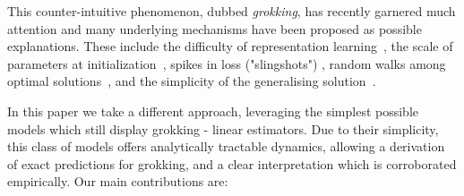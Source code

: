 \documentclass[a4paper,11pt]{article}
\begin{document}
This counter-intuitive phenomenon, dubbed \emph{grokking}, has recently garnered much attention and many underlying mechanisms have been proposed as possible explanations. These include the difficulty of representation learning~\cite{liu2022towards}, the scale of parameters at initialization~\cite{liu2023omnigrok}, spikes in loss ("slingshots") \cite{thilak2022slingshot}, random walks among optimal solutions~\cite{millidge2022}, and the simplicity of the generalising solution~\cite[Appendix E]{nanda2023progress}.

In this paper we take a different approach, leveraging the simplest possible models which still display grokking - linear estimators. Due to their simplicity, this class of models offers analytically tractable dynamics, allowing a derivation of exact predictions for grokking, and a clear interpretation which is corroborated empirically. Our main contributions are:
\end{document}
